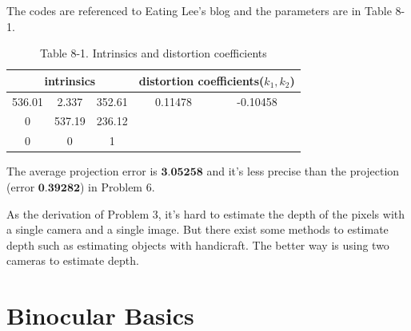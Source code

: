 \documentclass{article}
\begin{document}
\begin{enumerate}
The codes are referenced to Eating Lee's blog \cite{ref12} and the parameters are in Table 8-1.

\begin{table}[h]
	\caption*{Table 8-1. Intrinsics and distortion coefficients}
	\centering
	\begin{tabular}{ccc|cc}
		\toprule[2pt]
		\multicolumn{3}{c|}{intrinsics} & \multicolumn{2}{c}{distortion coefficients($k_1, k_2$)} \\ \hline
		536.01     & 2.337     & 352.61    & 0.11478           & -0.10458         	  \\
		0          & 537.19    & 236.12    & 					         & 						          \\
		0          & 0         & 1     		 & 					         &                      \\
		\bottomrule[2pt]
	\end{tabular}
\end{table}

The average projection error is $\textbf{3.05258}$ and it's less precise than the projection (error $\textbf{0.39282}$) in Problem 6.

\end{enumerate}

As the derivation of Problem 3, it's hard to estimate the depth of the pixels with a single camera and a single image. But there exist some methods to estimate depth such as estimating objects with handicraft. The better way is using two cameras to estimate depth.

\section*{Binocular Basics}
\end{document}
